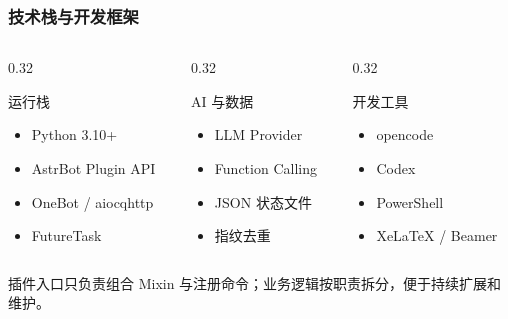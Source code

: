 \begin{frame}
  \frametitle{技术栈与开发框架}
  \begin{columns}[T]
    \begin{column}{0.32\textwidth}
      \begin{block}{运行栈}
        \begin{itemize}
          \item Python 3.10+
          \item AstrBot Plugin API
          \item OneBot / aiocqhttp
          \item FutureTask
        \end{itemize}
      \end{block}
    \end{column}
    \begin{column}{0.32\textwidth}
      \begin{block}{AI 与数据}
        \begin{itemize}
          \item LLM Provider
          \item Function Calling
          \item JSON 状态文件
          \item 指纹去重
        \end{itemize}
      \end{block}
    \end{column}
    \begin{column}{0.32\textwidth}
      \begin{block}{开发工具}
        \begin{itemize}
          \item opencode
          \item Codex
          \item PowerShell
          \item XeLaTeX / Beamer
        \end{itemize}
      \end{block}
    \end{column}
  \end{columns}
  \vspace{0.25cm}
  \begin{quoteBlock}
    插件入口只负责组合 Mixin 与注册命令；业务逻辑按职责拆分，便于持续扩展和维护。
  \end{quoteBlock}
\end{frame}


